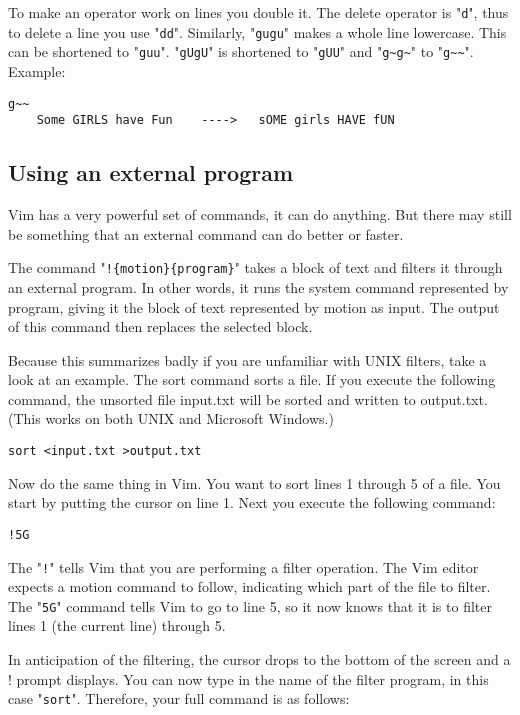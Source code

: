 To make an operator work on lines you double it.
The delete operator is "\verb!d!", thus to delete a line you use "\verb!dd!".
Similarly, "\verb!gugu!" makes a whole line lowercase.
This can be shortened to "\verb!guu!".
"\verb!gUgU!" is shortened to "\verb!gUU!" and "\verb!g~g~!" to "\verb!g~~!".
Example:

\begin{Verbatim}[samepage=true]
                            g~~ 
    Some GIRLS have Fun    ---->   sOME girls HAVE fUN 
\end{Verbatim}
\subsection{Using an external program}
Vim has a very powerful set of commands, it can do anything.
But there may still be something that an external command can do better or faster.

The command "\verb:!{motion}{program}:" takes a block of text and filters it through an external program.
In other words, it runs the system command represented by {program}, giving it the block of text represented by {motion} as input.
The output of this command then replaces the selected block.

Because this summarizes badly if you are unfamiliar with UNIX filters, take a look at an example.
The sort command sorts a file.
If you execute the following command, the unsorted file input.txt will be sorted and written to output.txt.
(This works on both UNIX and Microsoft Windows.)

\begin{Verbatim}[samepage=true]
 sort <input.txt >output.txt
\end{Verbatim}

Now do the same thing in Vim.
You want to sort lines 1 through 5 of a file.
You start by putting the cursor on line 1.
Next you execute the following command:

\begin{Verbatim}[samepage=true]
 !5G
\end{Verbatim}

The "\verb:!:" tells Vim that you are performing a filter operation.
The Vim editor expects a motion command to follow, indicating which part of the file to filter.
The "\verb!5G!" command tells Vim to go to line 5, so it now knows that it is to filter lines 1 (the current line) through 5.

In anticipation of the filtering, the cursor drops to the bottom of the screen and a ! prompt displays.
You can now type in the name of the filter program, in this case "\verb!sort!".
Therefore, your full command is as follows:

